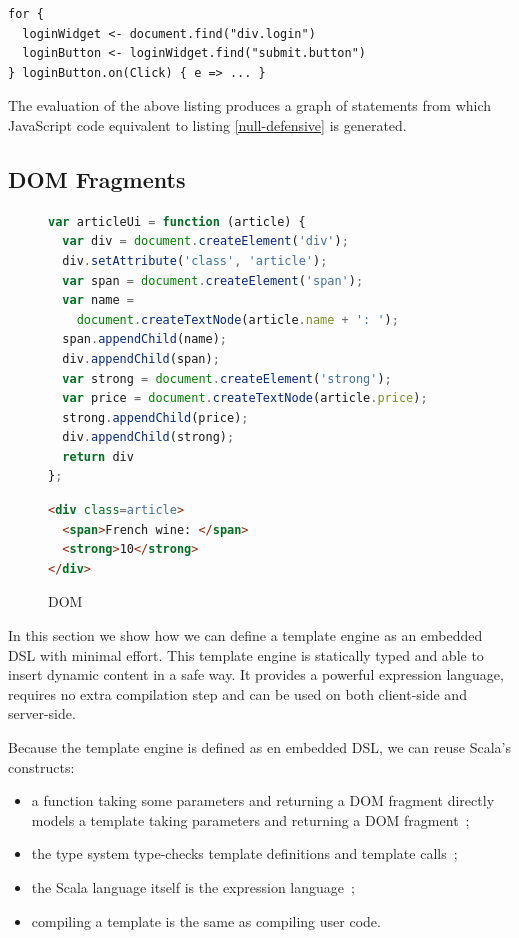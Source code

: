 \documentclass[preprint]{sigplanconf}
\begin{document}
\begin{lstlisting}
for {
  loginWidget <- document.find("div.login")
  loginButton <- loginWidget.find("submit.button")
} loginButton.on(Click) { e => ... }
\end{lstlisting}

The evaluation of the above listing produces a graph of statements from which JavaScript code equivalent to
listing \ref{null-defensive} is generated.

\subsection{DOM Fragments}

\begin{figure}
\label{dom-api}
\begin{lstlisting}[language=JavaScript]
var articleUi = function (article) {
  var div = document.createElement('div');
  div.setAttribute('class', 'article');
  var span = document.createElement('span');
  var name =
    document.createTextNode(article.name + ': ');
  span.appendChild(name);
  div.appendChild(span);
  var strong = document.createElement('strong');
  var price = document.createTextNode(article.price);
  strong.appendChild(price);
  div.appendChild(strong);
  return div
};
\end{lstlisting}

\begin{lstlisting}[language=HTML]
<div class=article>
  <span>French wine: </span>
  <strong>10</strong>
</div>
\end{lstlisting}
\caption{DOM}
\end{figure}

In this section we show how we can define a template engine as an embedded DSL with minimal effort. This template
engine is statically typed and able to insert dynamic content in a safe way. It provides a powerful expression
language, requires no extra compilation step and can be used on both client-side and server-side.

Because the template engine is defined as en embedded DSL, we can reuse Scala’s constructs:

\begin{itemize}
\item a function taking some parameters and returning a DOM fragment directly models a template taking parameters and
returning a DOM fragment~;
\item the type system type-checks template definitions and template calls~;
\item the Scala language itself is the expression language~;
\item compiling a template is the same as compiling user code.
\end{itemize}
\end{document}
